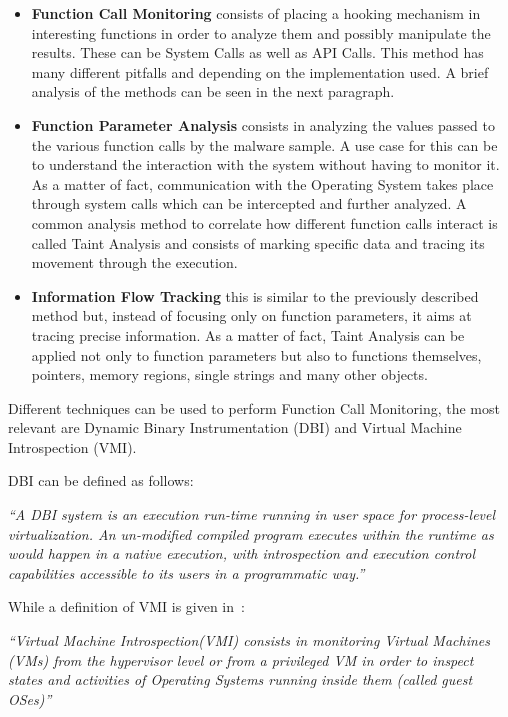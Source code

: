 \begin{itemize}
    \item \textbf{Function Call Monitoring} consists of placing a hooking mechanism in interesting functions in order to analyze them and possibly manipulate the results. These can be System Calls as well as API Calls. This method has many different pitfalls and depending on the implementation used. A brief analysis of the methods can be seen in the next paragraph.
    \item \textbf{Function Parameter Analysis} consists in analyzing the values passed to the various function calls by the malware sample. A use case for this can be to understand the interaction with the system without having to monitor it. As a matter of fact, communication with the Operating System takes place through system calls which can be intercepted and further analyzed. A common analysis method to correlate how different function calls interact is called Taint Analysis and consists of marking specific data and tracing its movement through the execution.
    \item \textbf{Information Flow Tracking} this is similar to the previously described method but, instead of focusing only on function parameters, it aims at tracing precise information. As a matter of fact, Taint Analysis can be applied not only to function parameters but also to functions themselves, pointers, memory regions, single strings and many other objects. 
\end{itemize}

Different techniques can be used to perform Function Call Monitoring, the most relevant are Dynamic Binary Instrumentation (DBI) and Virtual Machine Introspection (VMI).

DBI can be defined as follows:

\textit{``A DBI system is an execution run-time running in user space for process-level virtualization. An un-modified compiled program executes within the runtime as would happen in a native execution, with introspection and execution control capabilities accessible to its users in a programmatic way.''}~\cite{dbi}

While a definition of VMI is given in~\cite{7299979}: 

\textit{``Virtual Machine Introspection(VMI) consists in monitoring Virtual Machines (VMs) from the hypervisor level or from a privileged VM in order to inspect states and activities of Operating Systems running inside them (called guest OSes)''}~\cite{7299979}


